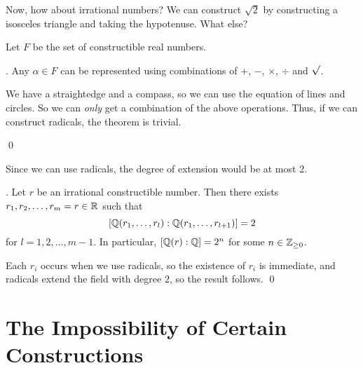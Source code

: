 Now, how about irrational numbers? We can construct \(\sqrt{2}\) by constructing a isosceles triangle and taking the hypotenuse. What else?

Let \(F\) be the set of constructible real numbers.

\thm. Any \(\alpha \in F\) can be represented using combinations of \(+\), \(-\), \(\times\), \(\div\) and \(\sqrt{\vphantom{l}}\).

\pf We have a straightedge and a compass, so we can use the equation of lines and circles. So we can \textit{only} get a combination of the above operations. Thus, if we can construct radicals, the theorem is trivial.

\begin{center}

    \usetikzlibrary {decorations.pathmorphing, decorations.pathreplacing, decorations.shapes}
\end{center}

\vspace*{-10pt}

\qed

Since we can use radicals, the degree of extension would be at most \(2\).

\cor. Let \(r\) be an irrational constructible number. Then there exists \(r_1, r_2, \dots, r_m = r \in \mathbb{R}\) such that
\[
    [\mathbb{Q}(r_1, \dots, r_l) : \mathbb{Q}(r_1, \dots, r_{l+1})] = 2
\]
for \(l = 1, 2, \dots, m - 1\). In particular, \([\mathbb{Q}(r) : \mathbb{Q}] = 2^n\) for some \(n \in \mathbb{Z}_{\geq 0}\).

\pf Each \(r_i\) occurs when we use radicals, so the existence of \(r_i\) is immediate, and radicals extend the field with degree \(2\), so the result follows. \qed

\section*{The Impossibility of Certain Constructions}


